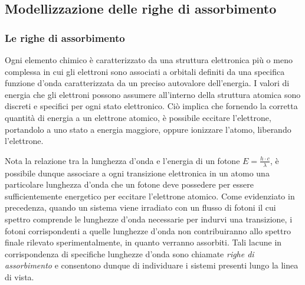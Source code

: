 \documentclass[a4paper,12pt]{article}
\begin{document}




%

\subsection{Modellizzazione delle righe di assorbimento}
\subsubsection{Le righe di assorbimento}
Ogni elemento chimico è caratterizzato da una struttura elettronica più o meno complessa in cui gli elettroni sono associati a orbitali definiti da una specifica funzione d'onda caratterizzata da un preciso autovalore dell'energia. I valori di energia che gli elettroni possono assumere all'interno della struttura atomica sono discreti e specifici per ogni stato elettronico. Ciò implica che fornendo la corretta quantità di energia a un elettrone atomico, è possibile eccitare l'elettrone, portandolo a uno stato a energia maggiore, oppure ionizzare l'atomo, liberando l'elettrone. 

Nota la relazione tra la lunghezza d'onda e l'energia di un fotone $ E= \frac{h \cdot c}{\lambda}$, è possibile dunque associare a ogni transizione elettronica in un atomo una particolare lunghezza d'onda che un fotone deve possedere per essere sufficientemente energetico per eccitare l'elettrone atomico. Come evidenziato in precedenza, quando un sistema viene irradiato con un flusso di fotoni il cui spettro comprende le lunghezze d'onda necessarie per indurvi una transizione, i fotoni corrispondenti a quelle lunghezze d'onda non contribuiranno allo spettro finale rilevato sperimentalmente, in quanto verranno assorbiti. Tali lacune in corrispondenza di specifiche lunghezze d'onda sono chiamate \textit{righe di assorbimento} e consentono dunque di individuare i sistemi presenti lungo la linea di vista. 

\end{document}

